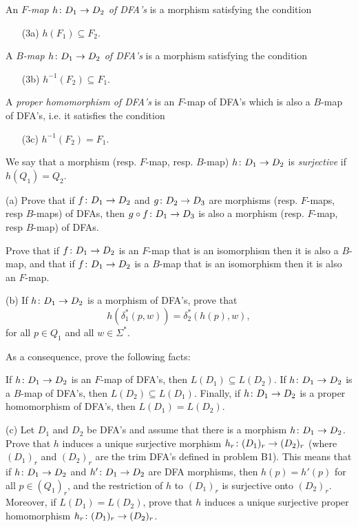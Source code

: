 \documentclass[12pt]{article}
\begin{document}
An {\it $F$-map $h\colon D_1\rightarrow D_2$ of DFA's\/} is a morphism
satisfying the condition 
\begin{enumerate}
\item[(3a)]
$h(F_1) \subseteq F_2$.
\end{enumerate}

\medskip
A {\it $B$-map $h\colon D_1\rightarrow D_2$ of DFA's\/} is a morphism
satisfying the condition
\begin{enumerate}
\item[(3b)]
$h^{-1}(F_2) \subseteq F_1$.
\end{enumerate}

\medskip
A {\it proper homomorphism of DFA's\/} is an $F$-map
of DFA's which is also a $B$-map of DFA's, i.e.
it satisfies the condition
\begin{enumerate}
\item[(3c)]
$h^{-1}(F_2) = F_1$.
\end{enumerate}

\medskip
We say that a morphism (resp. $F$-map, resp. $B$-map)
$h\colon D_1\rightarrow D_2$  is 
{\it surjective\/} if $h(Q_1) = Q_2$.

\medskip
(a)
Prove that
if $f\colon D_1\rightarrow D_2$ and $g\colon D_2\rightarrow D_3$ are
morphisms (resp. $F$-maps, resp $B$-maps) of DFAs,
then $g\circ f\colon D_1\rightarrow D_3$ is also a morphism
(resp. $F$-map, resp $B$-map) of DFAs.

\medskip
Prove that if  $f\colon D_1\rightarrow D_2$ is an $F$-map that is
an isomorphism then it is also a $B$-map, and that 
if  $f\colon D_1\rightarrow D_2$ is a $B$-map that is
an isomorphism then it is also an $F$-map.


\medskip
(b)
If $h\colon D_1\rightarrow D_2$  is a morphism
of DFA's, prove that
$$h(\delta_1^*(p, w)) = \delta_2^*(h(p), w),$$
for all $p\in Q_1$ and all $w\in \Sigma^*$.

\medskip
As a consequence, prove the following facts:

\medskip
If $h\colon D_1\rightarrow D_2$  is an $F$-map of DFA's, then
$L(D_1) \subseteq L(D_2)$.
If $h\colon D_1\rightarrow D_2$  is a $B$-map of DFA's, then
$L(D_2) \subseteq L(D_1)$.
Finally, if $h\colon D_1\rightarrow D_2$  is a proper  homomorphism of DFA's, then
$L(D_1) = L(D_2)$.

\medskip
(c)
Let $D_1$ and $D_2$ be DFA's and assume that there is a
morphism   $h\colon D_1\rightarrow D_2$.
Prove that $h$ induces a unique surjective morphism
$h_r\colon (D_1)_r\rightarrow (D_2)_r$
(where $(D_1)_r$ and $(D_2)_r$ are the trim DFA's
defined in problem B1). This means that
if   $h\colon D_1\rightarrow D_2$ and   $h'\colon D_1\rightarrow D_2$
are DFA morphisms, then $h(p) = h'(p)$ for all
$p\in (Q_1)_r$,
and the restriction of $h$ to $(D_1)_r$ is surjective onto $(D_2)_r$.
Moreover, if $L(D_1) = L(D_2)$,
prove that $h$ induces a unique surjective
proper  homomorphism   $h_r\colon (D_1)_r\rightarrow (D_2)_r$.
\end{document}
